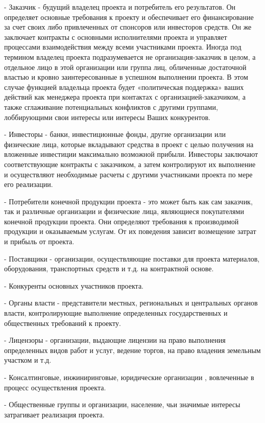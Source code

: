 \documentclass{../industrial-development}
\begin{document}
- Заказчик - будущий владелец проекта и потребитель его результатов. Он определяет основные требования к проекту и обеспечивает его финансирование за счет своих либо привлеченных от спонсоров или инвесторов средств. Он же заключает контракты с основными исполнителями проекта и управляет процессами взаимодействия между всеми участниками проекта. Иногда под термином владелец проекта подразумевается не организация-заказчик в целом, а отдельное лицо в этой организации или группа лиц, обличенные достаточной властью и кровно заинтересованные в успешном выполнении проекта. В этом случае функцией владельца проекта будет «политическая поддержка» ваших действий как менеджера проекта при контактах с организацией-заказчиком, а также сглаживание потенциальных конфликтов с другими группами, лоббирующими свои интересы или интересы Ваших конкурентов.

- Инвесторы - банки, инвестиционные фонды, другие организации или физические лица, которые вкладывают средства в проект с целью получения на вложенные инвестиции максимально возможной прибыли. Инвесторы заключают соответствующие контракты с заказчиком, а затем контролируют их выполнение и осуществляют необходимые расчеты с другими участниками проекта по мере его реализации.

- Потребители конечной продукции проекта - это может быть как сам заказчик, так и различные организации и физические лица, являющиеся покупателями конечной продукции проекта. Они определяют требования к производимой продукции и оказываемым услугам. От их поведения зависит возмещение затрат и прибыль от проекта.

- Поставщики - организации, осуществляющие поставки для проекта материалов, оборудования, транспортных средств и т.д. на контрактной основе.

- Конкуренты основных участников проекта.

- Органы власти - представители местных, региональных и центральных органов власти, контролирующие выполнение определенных государственных и общественных требований к проекту.

- Лицензоры - организации, выдающие лицензии на право выполнения определенных видов работ и услуг, ведение торгов, на право владения земельным участком и т.д.

- Консалтинговые, инжиниринговые, юридические организации , вовлеченные в процесс осуществления проекта.

- Общественные группы и организации, население, чьи значимые интересы затрагивает реализация проекта.
\end{document}
